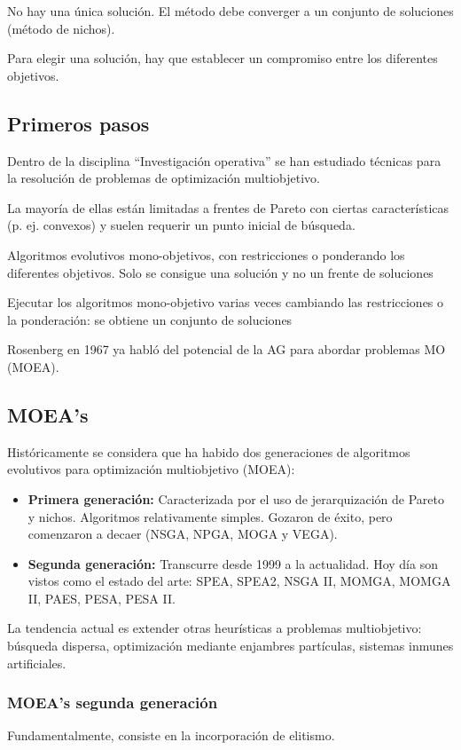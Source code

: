 \documentclass[12pt, twoside, openright]{report} %
\begin{document}
No hay una única solución. El método debe converger a un conjunto de soluciones (método de nichos).

Para elegir una solución, hay que establecer un compromiso entre los diferentes objetivos.

\subsection{Primeros pasos}
Dentro de la disciplina “Investigación operativa” se han estudiado técnicas para la resolución de problemas de optimización multiobjetivo.

La mayoría de ellas están limitadas a frentes de Pareto con ciertas características (p. ej. convexos) y suelen requerir un punto inicial de búsqueda.

Algoritmos evolutivos mono-objetivos, con restricciones o ponderando los diferentes objetivos. Solo se consigue una solución y no un frente de soluciones

Ejecutar los algoritmos mono-objetivo varias veces cambiando las restricciones o la ponderación: se obtiene un conjunto de soluciones

Rosenberg en 1967 ya habló del potencial de la AG para abordar problemas MO (MOEA).

\subsection{MOEA’s}
Históricamente se considera que ha habido dos generaciones de algoritmos evolutivos para optimización multiobjetivo (MOEA):
\begin{itemize}
	\item \textbf{Primera generación:} Caracterizada por el uso de jerarquización de Pareto y nichos. Algoritmos relativamente simples. Gozaron de éxito, pero comenzaron a decaer (NSGA, NPGA, MOGA y VEGA).
	\item \textbf{Segunda generación:} Transcurre desde 1999 a la actualidad. Hoy día son vistos como el estado del arte: SPEA, SPEA2, NSGA II, MOMGA, MOMGA II, PAES, PESA, PESA II.
\end{itemize} 
La tendencia actual es extender otras heurísticas a problemas multiobjetivo: búsqueda dispersa, optimización mediante enjambres partículas, sistemas inmunes artificiales.

\subsubsection{MOEA’s segunda generación}
Fundamentalmente, consiste en la incorporación de elitismo.
\end{document}
